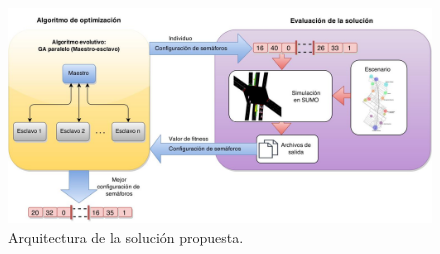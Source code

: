 \begin{figure}[H]
	\centering
	\includegraphics[width=0.99\linewidth]{Figures/arquitectura1}
	\caption{Arquitectura de la solución propuesta.}
	\label{fig:arquitectura1}
\end{figure}

